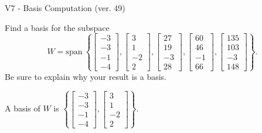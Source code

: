 \begin{exercise}
  \begin{exerciseTitle}V7 - Basis Computation (ver. 49)\end{exerciseTitle}
  \begin{exerciseStatement}
    Find a basis for the subspace 
\[W=\mathrm{span}\ \left\{\left[\begin{array}{r}
-3 \\
-3 \\
-1 \\
-4
\end{array}\right] , \left[\begin{array}{r}
3 \\
1 \\
-2 \\
2
\end{array}\right] , \left[\begin{array}{r}
27 \\
19 \\
-3 \\
28
\end{array}\right] , \left[\begin{array}{r}
60 \\
46 \\
-1 \\
66
\end{array}\right] , \left[\begin{array}{r}
135 \\
103 \\
-3 \\
148
\end{array}\right]\right\}.\]
 Be sure to explain why your result is a basis.


  \end{exerciseStatement}
  \begin{exerciseAnswer}
   A basis of \(W\) is  \(\left\{\left[\begin{array}{r}
-3 \\
-3 \\
-1 \\
-4
\end{array}\right] , \left[\begin{array}{r}
3 \\
1 \\
-2 \\
2
\end{array}\right]\right\}\).
  


  \end{exerciseAnswer}
\end{exercise}